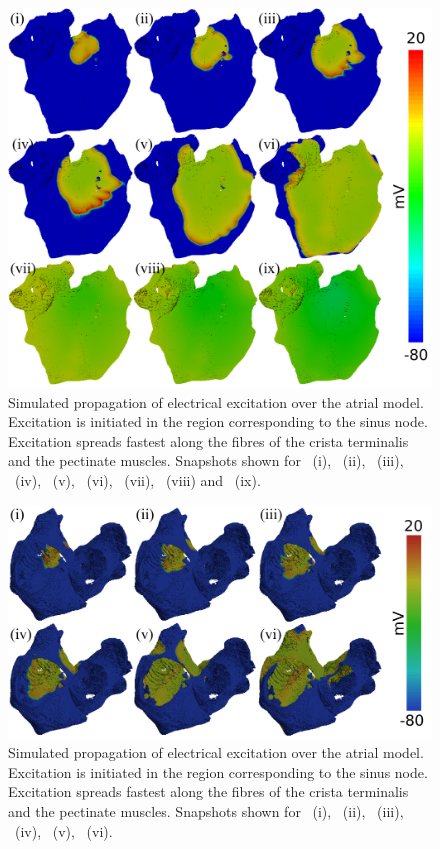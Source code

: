 \begin{figure}
\includegraphics{figures/atrium/validation/front_activation}
\caption[Snapshots of Electrical Activation under Sinus Rhythm (frontal)]{
\label{fig:atrium:validation:main}
Simulated propagation of electrical excitation over the atrial model.
Excitation is initiated in the region corresponding to the sinus node.
Excitation spreads fastest along the fibres of the crista terminalis and the
pectinate muscles.
Snapshots shown for \ (i), \ (ii), \ (iii), \ (iv),
\ (v), \ (vi), \ (vii), \ (viii) and \ (ix).
}
\end{figure}
\begin{figure}
\includegraphics{figures/atrium/validation/back_activation}
\caption[Snapshots of Electrical Activation under Sinus Rhythm (from ventricular
openings)]{
\label{fig:atrium:validation:valves}
Simulated propagation of electrical excitation over the atrial model.
Excitation is initiated in the region corresponding to the sinus node.
Excitation spreads fastest along the fibres of the crista terminalis and the
pectinate muscles.
Snapshots shown for \ (i), \ (ii), \ (iii), \ (iv),
\ (v), \ (vi).
}
\end{figure}
